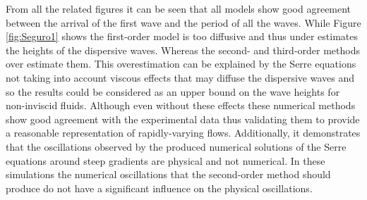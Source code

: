 \documentclass[SingleSpace,12pt,Proceedings]{Serre_ASCE}
\begin{document}
From all the related figures it can be seen that all models show good agreement between the arrival of the first wave and the period of all the waves. While Figure \ref{fig:Seguro1} shows the first-order model is too diffusive and thus under estimates the heights of the dispersive waves. Whereas the second- and third-order methods over estimate them. This overestimation can be explained by the Serre equations not taking into account viscous effects that may diffuse the dispersive waves and so the results could be considered as an upper bound on the wave heights for non-inviscid fluids. Although even without these effects these numerical methods show good agreement with the experimental data thus validating them to provide a reasonable representation of rapidly-varying flows. Additionally, it demonstrates that the oscillations observed by the produced numerical solutions of the Serre equations around steep gradients are physical and not numerical. In these simulations the numerical oscillations that the second-order method should produce \cite{Zoppou-Roberts-1996} do not have a significant influence on the physical oscillations.
\end{document}
